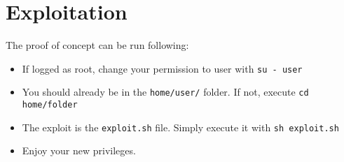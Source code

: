 \section{Exploitation}
The proof of concept can be run following:

\begin{itemize}
\item If logged as root, change your permission to user with {\tt su - user}
\item You should already be in the {\tt home/user/} folder. If not, execute {\tt cd home/folder}
\item The exploit is the {\tt exploit.sh} file. Simply execute it with {\tt sh exploit.sh}
\item Enjoy your new privileges.
\end{itemize}
